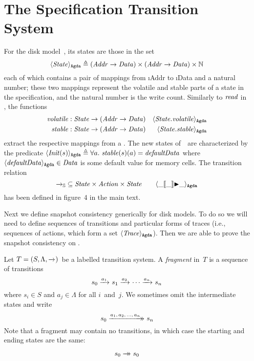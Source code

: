 
\section{The Specification Transition System~\Spec}
\label{sec:Spec}

For the disk model~\Spec, its states are those in the set
$$ \langle \mathit{State} \rangle_\mathtt{Agda} {}\triangleq{} (\mathit{Addr} \to \mathit{Data}) \times (\mathit{Addr} \to \mathit{Data}) \times \mathbb N $$
each of which contains a pair of mappings from \i{Addr} to \i{Data} and a natural number; these two mappings represent the volatile and stable parts of a state in the specification, and the natural number is the write count.
Similarly to $\mathit{read}$ in \Prog, the functions
\begin{align*}
\mathit{volatile} &: \mathit{State} \to (\mathit{Addr} \to \mathit{Data}) & \langle \mathit{State}.\mathit{volatile} \rangle_\mathtt{Agda} \\
\mathit{stable} &: \mathit{State} \to (\mathit{Addr} \to \mathit{Data}) & \langle \mathit{State}.\mathit{stable} \rangle_\mathtt{Agda}
\end{align*}
extract the respective mappings from a \SpecState.
The new states of~\Spec\ are characterized by the predicate $\AgdaId{\id{Init}(s)} \defeq \forall a.\ \id{stable}(s)(a) = \id{defaultData}$ where $\langle \mathit{defaultData} \rangle_\mathtt{Agda} \in \mathit{Data}$ is some default value for memory cells.
The transition relation
$$ {\xrightarrow{}_{\mathbb S}} \subseteq \mathit{State} \times \mathit{Action} \times \mathit{State} \qquad \langle \_[\kern-1.5pt[\_]\kern-1.5pt]{\blacktriangleright}\_ \rangle_\mathtt{Agda} $$
has been defined in figure~4 in the main text.

Next we define snapshot consistency generically for disk models.
To do so we will need to define sequences of transitions and particular forms of traces (i.e., sequences of actions, which form a set $\langle \mathit{Trace} \rangle_\mathtt{Agda}$).
Then we are able to prove the snapshot consistency on \Spec.

\begin{definition}\label{def:frag}
Let $T = (S, \Lambda, \xrightarrow{}_{})$~be a labelled transition system.
A \emph{fragment} in~$T$ is a sequence of transitions
$$ s_0 \xrightarrow{a_1}_{} s_1 \xrightarrow{a_2}_{} \cdots \xrightarrow{a_n}_{} s_n $$
where $s_i \in S$ and $a_j \in \Lambda$ for all $i$~and~$j$.
We sometimes omit the intermediate states and write
$$ s_0 \xrightarrow{a_1,\,a_2,\,\ldots,\,a_n}\mathrel{\mkern-14mu}\rightarrow_{} s_n $$
Note that a fragment may contain no transitions, in which case the starting and ending states are the same: 
$$ s_0 \xrightarrow{\vphantom{a_n}}\mathrel{\mkern-14mu}\rightarrow_{} s_0 $$
\end{definition}

